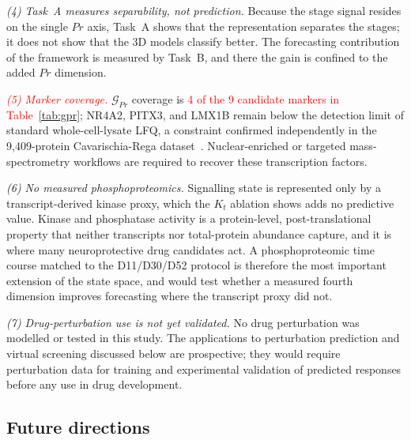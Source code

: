 \documentclass[5p,times,twocolumn]{elsarticle}
\newcommand{\rtag}[1]{}
\newcommand{\rev}[2]{\rtag{#1}\textcolor{red}{#2}}
\newenvironment{revblock}[1]{\par\color{red}\rtag{#1}\ignorespaces}{\par}
\begin{document}
\begin{revblock}{R1.8,R2.12}
  \textit{(4) Task~A measures separability, not prediction.}
  Because the stage signal resides on the single $Pr$ axis, Task~A
  shows that the representation separates the stages; it does not
  show that the 3D models classify better. The forecasting
  contribution of the framework is measured by Task~B, and there
  the gain is confined to the added $Pr$ dimension.
\end{revblock}

\rev{AC}{\textit{(5) Marker coverage.}}
$\mathcal{G}_{Pr}$ coverage is \rev{AC}{4 of the 9 candidate
  markers in Table~\ref{tab:gpr}};
NR4A2, PITX3, and LMX1B remain below the detection limit of
standard whole-cell-lysate LFQ, a constraint confirmed
independently in the 9,409-protein Cavarischia-Rega
dataset~\cite{cavarischia2024proteome}.
Nuclear-enriched or targeted mass-spectrometry workflows are
required to recover these transcription factors.

\begin{revblock}{R1.12}
  \textit{(6) No measured phosphoproteomics.} Signalling state is
  represented only by a transcript-derived kinase proxy, which the
  $K_t$ ablation shows adds no predictive value. Kinase and
  phosphatase activity is a protein-level, post-translational
  property that neither transcripts nor total-protein abundance
  capture, and it is where many neuroprotective drug candidates
  act. A phosphoproteomic time course matched to the D11/D30/D52
  protocol is therefore the most important extension of the state
  space, and would test whether a measured fourth dimension
  improves forecasting where the transcript proxy did not.
\end{revblock}

\begin{revblock}{R2.20}
  \textit{(7) Drug-perturbation use is not yet validated.} No drug
  perturbation was modelled or tested in this study. The
  applications to perturbation prediction and virtual screening
  discussed below are prospective; they would require
  perturbation data for training and experimental validation of
  predicted responses before any use in drug development.
\end{revblock}

\subsection{\textbf{Future directions}}
\end{document}
